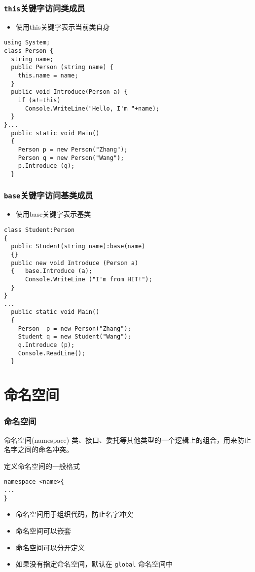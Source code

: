 \begin{frame}[fragile]
\frametitle{\texttt{this}关键字访问类成员}
\begin{itemize}
\item 使用this关键字表示当前类自身
\end{itemize}
\begin{lstlisting}
using System;
class Person {
  string name;
  public Person (string name) {
    this.name = name;
  }
  public void Introduce(Person a) {
    if (a!=this)
      Console.WriteLine("Hello, I'm "+name);
  }
}...
  public static void Main()
  {
    Person p = new Person("Zhang");
    Person q = new Person("Wang");
    p.Introduce (q);
  }
\end{lstlisting}
\end{frame}

\begin{frame}[fragile]
\frametitle{\texttt{base}关键字访问基类成员}
\begin{itemize}
\item 使用base关键字表示基类
\end{itemize}
\begin{lstlisting}
class Student:Person
{
  public Student(string name):base(name)
  {}
  public new void Introduce (Person a)
  {   base.Introduce (a);
      Console.WriteLine ("I'm from HIT!");
  }
}
...
  public static void Main()
  {
    Person  p = new Person("Zhang");
    Student q = new Student("Wang");
    q.Introduce (p);
    Console.ReadLine();
  }
\end{lstlisting}
\end{frame}

\section{命名空间}

\begin{frame}[fragile]
\frametitle{命名空间}
\begin{block}{命名空间(namespace)}
  \CJKindent 类、接口、委托等其他类型的一个逻辑上的组合，用来防止名字之间的命名冲突。
\end{block}
定义命名空间的一般格式
\begin{lstlisting}
namespace <name>{
...
}
\end{lstlisting}
\begin{itemize}
\item 命名空间用于组织代码，防止名字冲突
\item 命名空间可以嵌套
\item 命名空间可以分开定义
\item 如果没有指定命名空间，默认在 \texttt{global} 命名空间中
\end{itemize}
\end{frame}

